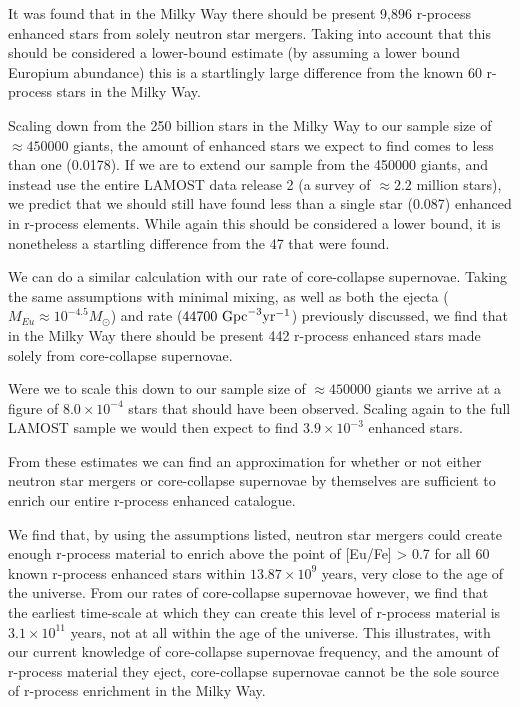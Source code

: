 \documentclass[a4paper,fleqn,usenatbib]{mnras}
\begin{document}
    It was found that in the Milky Way there should be present 9,896 r-process enhanced stars from solely neutron star mergers. Taking into account that this should be considered a lower-bound estimate (by assuming a lower bound Europium abundance) this is a startlingly large difference from the known 60 r-process stars in the Milky Way.
    
    Scaling down from the 250 billion stars in the Milky Way to our sample size of $\approx450000$ giants, the amount of enhanced stars we expect to find comes to less than one (0.0178). If we are to extend our sample from the 450000 giants, and instead use the entire LAMOST data release 2 (a survey of $\approx2.2$ million stars), we predict that we should still have found less than a single star (0.087) enhanced in r-process elements. While again this should be considered a lower bound, it is nonetheless a startling difference from the 47 that were found.
    
    We can do a similar calculation with our rate of core-collapse supernovae. Taking the same assumptions with minimal mixing, as well as both the ejecta ($M_{Eu}\approx10^{-4.5} M_{\odot}$) and rate ($44700\ \rm{Gpc}^{-3} \rm{yr^{-1}}$) previously discussed, we find that in the Milky Way there should be present 442 r-process enhanced stars made solely from core-collapse supernovae.
    
    Were we to scale this down to our sample size of $\approx450000$ giants we arrive at a figure of $8.0\times10^{-4}$ stars that should have been observed. Scaling again to the full LAMOST sample we would then expect to find $3.9\times10^{-3}$ enhanced stars. 
    
    From these estimates we can find an approximation for whether or not either neutron star mergers or core-collapse supernovae by themselves are sufficient to enrich our entire r-process enhanced catalogue. 
    
    We find that, by using the assumptions listed, neutron star mergers could create enough r-process material to enrich above the point of [Eu/Fe] > 0.7 for all 60 known r-process enhanced stars within $13.87\times10^9$ years, very close to the age of the universe. From our rates of core-collapse supernovae however, we find that the earliest time-scale at which they can create this level of r-process material is $3.1\times10^{11}$ years, not at all within the age of the universe. This illustrates, with our current knowledge of core-collapse supernovae frequency, and the amount of r-process material they eject, core-collapse supernovae cannot be the sole source of r-process enrichment in the Milky Way.
    
\end{document}
